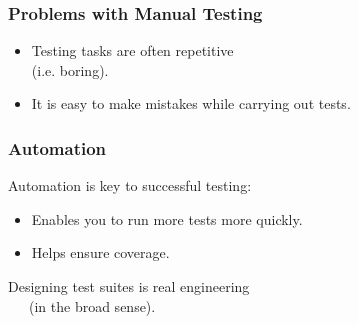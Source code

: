 \documentclass{beamer}
\newenvironment{changemargin}[1]{%
  \begin{list}{}{%
    \setlength{\topsep}{0pt}%
    \setlength{\leftmargin}{#1}%
    \setlength{\rightmargin}{1em}
    \setlength{\listparindent}{\parindent}%
    \setlength{\itemindent}{\parindent}%
    \setlength{\parsep}{\parskip}%
  }%
  \item[]}{\end{list}}
\begin{document}
\begin{frame}
\Large
\frametitle{Problems with Manual Testing}

  \begin{changemargin}{2em}

\begin{itemize}
\item Testing tasks are often repetitive\\ (i.e. boring).
\item It is easy to make mistakes while carrying out tests.
\end{itemize}
  \end{changemargin}
\end{frame}

\begin{frame}
\frametitle{Automation}

  \begin{changemargin}{2em}
\Large
\alert{Automation} is key to successful testing:

\begin{itemize}
\item Enables you to run more tests more quickly.
\item Helps ensure coverage.
\end{itemize}
Designing test suites is real engineering\\ ~~~(in the broad sense).

  \end{changemargin}
\end{frame}
\end{document}
